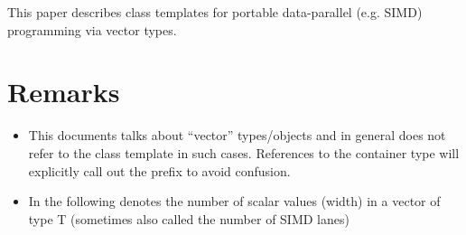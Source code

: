 \newcommand\wgTitle{Data-Parallel Vector Types \& Operations}
\newcommand\wgName{Matthias Kretz <kretz@compeng.uni-frankfurt.de>}
\newcommand\wgVersion{Version 1}
\newcommand\wgDocumentNumber{D4XXX}
\newcommand\wgPreviousDocumentNumber{N4184, N4185, N4395}
\newcommand\wgAcknowledgements{
  This work was supported by GSI Helmholtzzentrum für Schwerionenforschung
  and the Hessian LOEWE initiative through the Helmholtz International Center
  for FAIR (HIC for FAIR).
}

\usepackage{typenames}
\usepackage{mymacros}
\usepackage{wg21}
\usepackage{vectorpictures}
\usepackage{references}




\begin{wgTitlepage}
  This paper describes class templates for portable data-parallel (e.g. SIMD) programming via vector types.
\end{wgTitlepage}

\pagestyle{scrheadings}
\addtocounter{section}{-1}
\section{Remarks}
\begin{itemize}
  \item This documents talks about “vector” types/objects and in general does not refer to the \std{} class template in such cases.
    References to the container type will explicitly call out the  prefix to avoid confusion.
  \item In the following  denotes the number of scalar values (width) in a vector of type \type T (sometimes also called the number of SIMD lanes)
\end{itemize}


%

